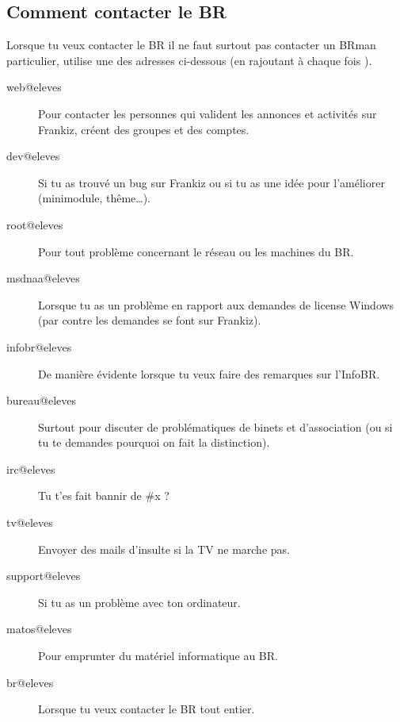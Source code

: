 \subsection{Comment contacter le BR}

Lorsque tu veux contacter le BR il ne faut surtout pas contacter un BRman particulier, utilise une des adresses ci-dessous (en rajoutant à chaque fois ).

\begin{description}

\item[web@eleves] Pour contacter les personnes qui valident les annonces et activités sur Frankiz, créent des groupes et des comptes.

\item[dev@eleves] Si tu as trouvé un bug sur Frankiz ou si tu as une idée pour l'améliorer (minimodule, thême\dots).

\item[root@eleves] Pour tout problème concernant le réseau ou les machines du BR.

\item[msdnaa@eleves] Lorsque tu as un problème en rapport aux demandes de license Windows (par contre les demandes se font sur Frankiz).

\item[infobr@eleves] De manière évidente lorsque tu veux faire des remarques sur l'InfoBR.

\item[bureau@eleves] Surtout pour discuter de problématiques de binets et d'association (ou si tu te demandes pourquoi on fait la distinction). 

\item[irc@eleves] Tu t'es fait bannir de #x ?

\item[tv@eleves] Envoyer des mails d'insulte si la TV ne marche pas.

\item[support@eleves] Si tu as un problème avec ton ordinateur.

\item[matos@eleves] Pour emprunter du matériel informatique au BR.

\item[br@eleves] Lorsque tu veux contacter le BR tout entier.

\end{description}
